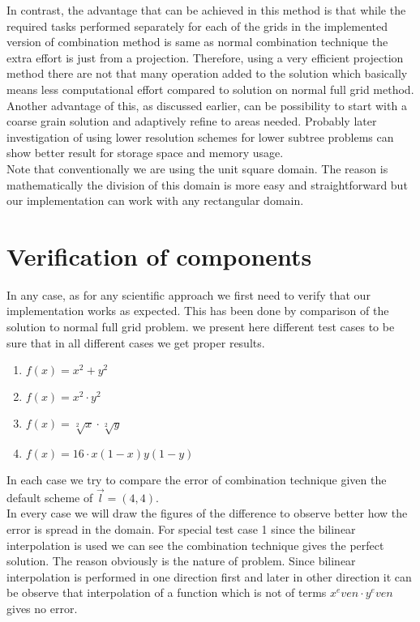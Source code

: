 In contrast, the advantage that can be achieved in this method is that while the required tasks performed separately for each of the grids in the implemented version of combination method is same as normal combination technique the extra effort is just from a projection. Therefore, using a very efficient projection method there are not that many operation added to the solution which basically means less computational effort compared to solution on normal full grid method.\\
Another advantage of this, as discussed earlier, can be possibility to start with a coarse grain solution and adaptively refine to areas needed. Probably later investigation of using lower resolution schemes for lower subtree problems can show better result for storage space and memory usage. \\
Note that conventionally we are using the unit square domain. The reason is mathematically the division of this domain is more easy and straightforward but our implementation can work with any rectangular domain. 


\section{Verification of components}
In any case, as for any scientific approach we first need to verify that our implementation works as expected. This has been done by comparison of the solution to normal full grid problem. we present here different test cases to be sure that in all different cases we get proper results.
\begin{enumerate}
\item $f(x)=x^2+y^2$
\item $f(x)=x^2 \cdot y^2 $
\item $f(x)=\sqrt[2]{x} \cdot \sqrt[2]{y}$
\item $f(x)=16 \cdot x(1-x)y(1-y)$
\end{enumerate}
In each case we try to compare the error of combination technique given the default scheme of $\overrightarrow{l}=(4,4)$.\\
In every case we will draw the figures of the difference to observe better how the error is spread in the domain. For special test case 1 since the bilinear interpolation is used we can see the combination technique gives the perfect solution. The reason obviously is the nature of problem. Since bilinear interpolation is performed in one direction first and later in other direction it can be observe that interpolation of a function which is not of terms $x^even \cdot y^even$ gives no error.

